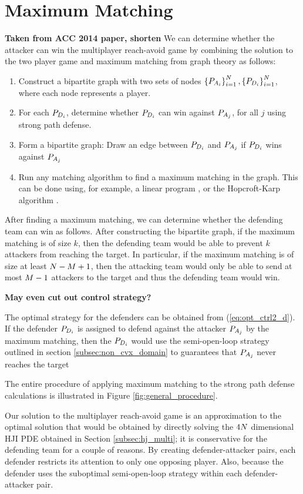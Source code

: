 \section{Maximum Matching}
\label{subsec:max_match}
\textbf{Taken from ACC 2014 paper, shorten}
We can determine whether the attacker can win the multiplayer reach-avoid game by combining the solution to the two player game and maximum matching \cite{Schrjiver2004, Karpinski1998} from graph theory as follows:

\begin{enumerate}
\item Construct a bipartite graph with two sets of nodes $\left\{P_{A_{i}}\right\}_{i=1}^N,\left\{P_{D_{i}}\right\}_{i=1}^N$, where each node represents a player.
\item For each $P_{D_{i}}$, determine whether $P_{D_{i}}$ can win against $P_{A_{j}}$, for all $j$ using strong path defense. 
\item Form a bipartite graph: Draw an edge between $P_{D_{i}}$ and $P_{A_{j}}$ if $P_{D_{i}}$ wins against $P_{A_{j}}$
\item Run any matching algorithm to find a maximum matching in the graph. This can be done using, for example, a linear program \cite{Schrjiver2004}, or the Hopcroft-Karp algorithm \cite{Karpinski1998}.
\end{enumerate}

After finding a maximum matching, we can determine whether the defending team can win as follows. After constructing the bipartite graph, if the maximum matching is of size $k$, then the defending team would be able to prevent $k$ attackers from reaching the target. In particular, if the maximum matching is of size at least $N-M+1$, then the attacking team would only be able to send at most $M-1$ attackers to the target and thus the defending team would win. 

\textbf{May even cut out control strategy?}

The optimal strategy for the defenders can be obtained from (\ref{eq:opt_ctrl2_d}). If the \ith defender $P_{D_{i}}$ is assigned to defend against the \jth attacker $P_{A_{j}}$ by the maximum matching, then the $P_{D_{i}}$ would use the semi-open-loop strategy outlined in section \ref{subsec:non_cvx_domain} to guarantees that $P_{A_{j}}$ never reaches the target 

The entire procedure of applying maximum matching to the strong path defense calculations is illustrated in Figure \ref{fig:general_procedure}.

Our solution to the multiplayer reach-avoid game is an approximation to the optimal solution that would be obtained by directly solving the $4N$ dimensional HJI PDE obtained in Section \ref{subsec:hj_multi}; it is conservative for the defending team for a couple of reasons. By creating defender-attacker pairs, each defender restricts its attention to only one opposing player. Also, because the defender uses the suboptimal semi-open-loop strategy within each defender-attacker pair. 

